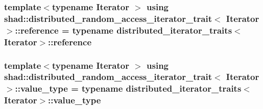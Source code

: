 \hypertarget{structshad_1_1distributed__random__access__iterator__trait_a67a58fe073cae4c0f77eb9ea96844bc1}{
\subsubsection[{reference}]{\setlength{\rightskip}{0pt plus 5cm}template$<$typename Iterator $>$ using {\bf shad\-::distributed\-\_\-random\-\_\-access\-\_\-iterator\-\_\-trait}$<$ Iterator $>$\-::{\bf reference} =  typename {\bf distributed\-\_\-iterator\-\_\-traits}$<$Iterator$>$\-::{\bf reference}}}\label{structshad_1_1distributed__random__access__iterator__trait_a67a58fe073cae4c0f77eb9ea96844bc1}
\hypertarget{structshad_1_1distributed__random__access__iterator__trait_a8b61d58bf5959893ece6c9f38a1acf5d}{
\subsubsection[{value\-\_\-type}]{\setlength{\rightskip}{0pt plus 5cm}template$<$typename Iterator $>$ using {\bf shad\-::distributed\-\_\-random\-\_\-access\-\_\-iterator\-\_\-trait}$<$ Iterator $>$\-::{\bf value\-\_\-type} =  typename {\bf distributed\-\_\-iterator\-\_\-traits}$<$Iterator$>$\-::{\bf value\-\_\-type}}}\label{structshad_1_1distributed__random__access__iterator__trait_a8b61d58bf5959893ece6c9f38a1acf5d}


